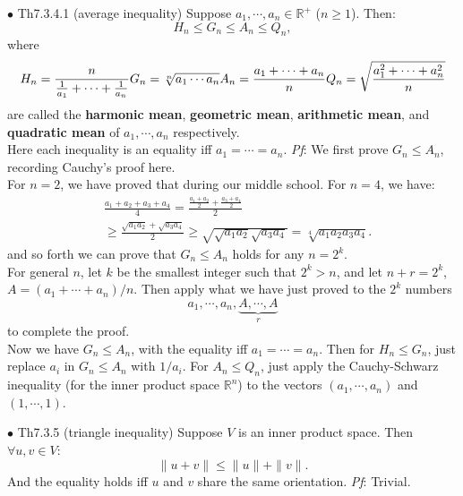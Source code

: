 \documentclass{article}
\begin{document}
\begin{Th}{$\bullet$ Th7.3.4.1 (average inequality)}
    Suppose $a_1, \cdots, a_n\in\mathbb{R}^+$ ($n\geq 1$). Then:
    $$ H_n \leq G_n \leq A_n \leq Q_n,$$
    where 
    $$ H_n = \frac{n}{\frac{1}{a_1} + \cdots + \frac{1}{a_n}} \\
    G_n = \sqrt[n]{a_1\cdots a_n} \\
    A_n = \frac{a_1 + \cdots + a_n}{n} \\
    Q_n = \sqrt{\frac{a_1^2 + \cdots + a_n^2}{n}} $$
    are called the \textbf{harmonic mean}, \textbf{geometric mean}, \textbf{arithmetic mean}, and \textbf{quadratic mean} of $a_1, \cdots, a_n$ respectively. \\
    Here each inequality is an equality iff $a_1 = \cdots = a_n$.
    \tcblower
    \textit{Pf}: We first prove $G_n\leq A_n$, recording Cauchy's proof here. \\
    For $n=2$, we have proved that during our middle school. For $n=4$, we have:
    $$\begin{aligned}
        & \frac{a_1+a_2+a_3+a_4}{4} = \frac{\frac{a_1+a_2}{2} + \frac{a_3+a_4}{2}}{2} \\
        & \geq \frac{\sqrt{a_1a_2} + \sqrt{a_3a_4}}{2} \geq \sqrt{\sqrt{a_1a_2}\sqrt{a_3a_4}} = \sqrt[4]{a_1a_2a_3a_4}.
    \end{aligned}$$
    and so forth we can prove that $G_n\leq A_n$ holds for any $n = 2^k$. \\
    For general $n$, let $k$ be the smallest integer such that $2^k > n$, and let $n+r = 2^k$, $A = (a_1+\cdots+a_n)/n$. Then apply what we have just proved to the $2^k$ numbers 
    $$a_1, \cdots, a_n, \underbrace{A, \cdots, A}_{r}$$
    to complete the proof. \\
    Now we have $G_n\leq A_n$, with the equality iff $a_1 = \cdots = a_n$. Then for $H_n\leq G_n$, just replace $a_i$ in $G_n\leq A_n$ with $1/a_i$. For $A_n\leq Q_n$, just apply the Cauchy-Schwarz inequality (for the inner product space $\mathbb{R}^n$) to the vectors $(a_1, \cdots, a_n)$ and $(1, \cdots, 1)$.
\end{Th}

\begin{Th}{$\bullet$ Th7.3.5 (triangle inequality)}
    Suppose $V$ is an inner product space. Then $\forall u, v\in V$:
    $$\|u+v\|\leq \|u\| + \|v\|.$$
    And the equality holds iff $u$ and $v$ share the same orientation.
    \tcblower
    \textit{Pf}: Trivial.
\end{Th}
\end{document}
